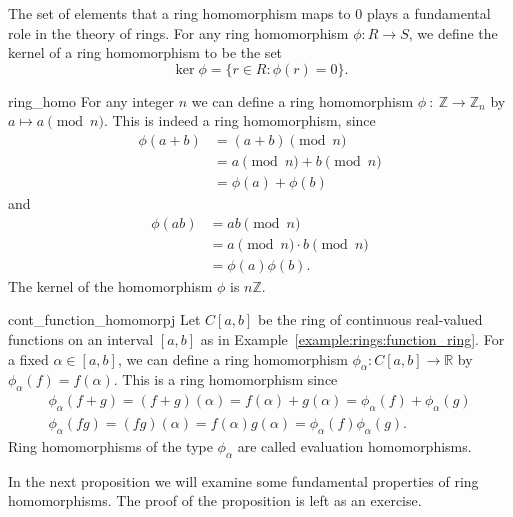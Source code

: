  
The set of elements that a ring homomorphism maps to $0$ plays a
fundamental role in the theory of rings. For any ring homomorphism
$\phi : R \rightarrow S$, we define the {\bfi
kernel\/} of a ring homomorphism to be the set
\[
\ker \phi = \{ r \in R : \phi( r ) = 0 \}.
\]
 
 
\begin{example}{ring_homo}
For any integer $n$ we can define a ring homomorphism $\phi~:~{\mathbb Z}
\rightarrow {\mathbb Z}_n$ by $a \mapsto a \pmod{n}$. This is indeed a
ring homomorphism, since 
\begin{align*}
\phi( a + b )  & = (a + b) \pmod{n} \\
 & =  a \pmod{n} + b \pmod{n}\\
 & = \phi( a ) + \phi(b)
\end{align*}
and
\begin{align*}
\phi( a b )  & =  ab \pmod{n} \\
 & = a \pmod{n}\cdot  b \pmod{n} \\
 & = \phi( a ) \phi(b).
\end{align*}
The kernel of the homomorphism $\phi$ is $n {\mathbb Z}$.
\end{example}
 
 
\begin{example}{cont_function_homomorpj}
Let $C[a, b]$ be the ring of continuous real-valued functions on an
interval $[a,b]$ as in Example~\ref{example:rings:function_ring}. For a fixed  $\alpha \in [a, b]$,
we can define a ring homomorphism $\phi_{\alpha} : C[a, b] \rightarrow
{\mathbb R}$ by $\phi_{\alpha} (f ) = f( \alpha)$. This  is a ring
homomorphism since 
\[
\begin{array}{c}
\phi_{\alpha}( f + g )  = (f + g)( \alpha) = f(\alpha) + g(\alpha) =
\phi_{\alpha}( f ) + \phi_{\alpha}(g ) \\
\phi_{\alpha}( f  g )  = (f  g)( \alpha) = f(\alpha)  g(\alpha) =
\phi_{\alpha}( f )  \phi_{\alpha}(g ).
\end{array}
\]
Ring homomorphisms of the type $\phi_{\alpha}$ are called {\bfi
evaluation homomorphisms}.
\end{example}
 
 

 
 
In the next proposition we will examine some fundamental properties
of ring homomorphisms. The proof of the proposition is left as an
exercise.
 
